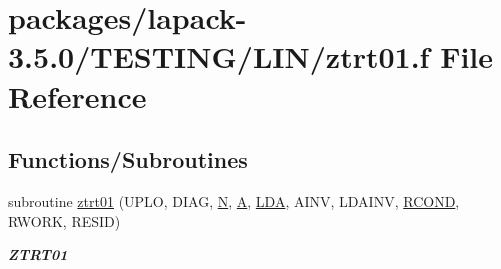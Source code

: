 \hypertarget{ztrt01_8f}{}\section{packages/lapack-\/3.5.0/\+T\+E\+S\+T\+I\+N\+G/\+L\+I\+N/ztrt01.f File Reference}
\label{ztrt01_8f}
\subsection*{Functions/\+Subroutines}
\begin{DoxyCompactItemize}
\item 
subroutine \hyperlink{group__complex16__lin_gaa5d5db213ec0e40b3c6bcb78c93c6e5c}{ztrt01} (U\+P\+L\+O, D\+I\+A\+G, \hyperlink{polmisc_8c_a0240ac851181b84ac374872dc5434ee4}{N}, \hyperlink{classA}{A}, \hyperlink{example__user_8c_ae946da542ce0db94dced19b2ecefd1aa}{L\+D\+A}, A\+I\+N\+V, L\+D\+A\+I\+N\+V, \hyperlink{superlu__enum__consts_8h_af00a42ecad444bbda75cde1b64bd7e72a9b5c151728d8512307565994c89919d5}{R\+C\+O\+N\+D}, R\+W\+O\+R\+K, R\+E\+S\+I\+D)
\begin{DoxyCompactList}\small\item\em {\bfseries Z\+T\+R\+T01} \end{DoxyCompactList}\end{DoxyCompactItemize}
